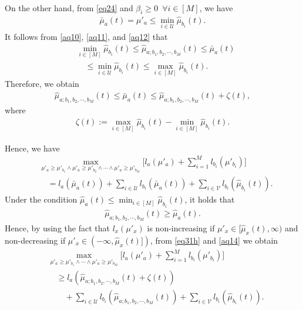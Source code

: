 \documentclass[final]{IEEEtran}
\newcommand{\nn}{\nonumber}
\newcommand{\calU}{\mathcal{U}}
\newcommand{\calV}{\mathcal{V}}
\begin{document}
\begin{itemize}
\begin{align}
\end{align}
On the other hand, from \eqref{eq24} and $\beta_i \geq 0 \enspace \forall i \in [M]$, we have
\begin{align}
\bar{\mu}_a(t)=\mu'_a \leq \min_{i \in \calU} \hat{\mu}_{b_i}(t)  \label{aq12}. 
\end{align}
It follows from \eqref{aq10}, \eqref{aq11}, and \eqref{aq12} that
\begin{align}
 &\min_{i \in [M]} \hat{\mu}_{b_i}(t) \leq \hat{\mu}_{a;b_1,b_2,\cdots, b_M}(t) \leq \bar{\mu}_a(t)\nn\\
 &\quad  \leq \min_{i \in \calU} \hat{\mu}_{b_i}(t) \leq \max_{i \in [M]} \hat{\mu}_{b_i}(t) \label{aq13}.
\end{align}
Therefore, we obtain
\begin{align}
 \hat{\mu}_{a;b_1,b_2,\cdots, b_M}(t) \leq \bar{\mu}_a(t) \leq  \hat{\mu}_{a;b_1,b_2,\cdots, b_M}(t)+ \zeta(t) \label{aq14},
\end{align} where
\begin{align}
\zeta(t):= \max_{i \in [M]} \hat{\mu}_{b_i}(t) - \min_{i \in [M]} \hat{\mu}_{b_i}(t).
\end{align}
\end{itemize}
Hence, we have
\begin{align}
&\max_{\mu'_a\geq \mu'_{b_1} \wedge \mu'_a \geq \mu'_{b_2} \wedge \cdots \wedge \mu'_a \geq \mu'_{b_M} }\bigg[l_a(\mu'_a)+\sum_{i=1}^M l_{b_i}(\mu'_{b_i})\bigg] \nn\\
&\quad = l_a(\bar{\mu}_a(t))+\sum_{i\in \calU} l_{b_i} (\bar{\mu}_a(t)) +\sum_{i \in \calV} l_{b_i}(\hat{\mu}_{b_i}(t))\label{eq31h}.
\end{align}
Under the condition $\hat{\mu}_a (t) \leq \min_{i \in [M]} \hat{\mu}_{b_i}(t)$, it holds that
\begin{align}
 \hat{\mu}_{a;b_1,b_2,\cdots, b_M}(t)\geq \hat{\mu}_a(t). 
\end{align}
Hence, by using the fact that $l_x(\mu'_x)$ is non-increasing if $\mu'_x \in [\hat{\mu}_x(t), \infty)$ and non-decreasing if $\mu'_x \in (-\infty, \hat{\mu}_x(t)])$, from \eqref{eq31h} and \eqref{aq14} we obtain
\begin{align}
&\max_{\mu'_a\geq \mu'_{b_1} \wedge  \cdots \wedge \mu'_a \geq \mu'_{b_M} }\bigg[l_a(\mu'_a)+\sum_{i=1}^M l_{b_i}(\mu'_{b_i})\bigg]\nn\\
&\quad  \geq l_a(\hat{\mu}_{a;b_1,b_2,\cdots, b_M}(t)+ \zeta(t) )\nn\\
&\qquad +\sum_{i \in \calU}l_{b_i} (\hat{\mu}_{a;b_1,b_2,\cdots, b_M}(t))+\sum_{i \in \calV} l_{b_i}(\hat{\mu}_{b_i}(t)) \label{eq31k}.
\end{align}
\end{document}
